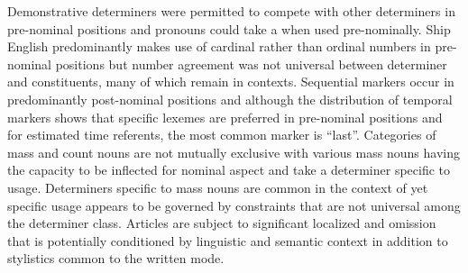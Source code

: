 Demonstrative determiners were permitted to compete with other determiners in pre-nominal positions and  pronouns could take a  when used pre-nominally. Ship English predominantly makes use of cardinal rather than ordinal numbers in pre-nominal positions but number agreement was not universal between determiner and  constituents, many of which remain  in  contexts. Sequential markers occur in predominantly post-nominal positions and although the distribution of temporal markers shows that specific lexemes are preferred in pre-nominal positions and for estimated time referents, the most common marker is “last”.  Categories of mass and count nouns are not mutually exclusive with various mass nouns having the capacity to be inflected for  nominal aspect and take a determiner specific to  usage. Determiners specific to mass nouns are common in the context of  yet specific usage appears to be governed by constraints that are not universal among the determiner class.  Articles are subject to significant localized  and omission that is potentially conditioned by linguistic and semantic context in addition to stylistics common to the written mode.

